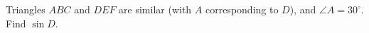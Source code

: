 Triangles $ABC$ and $DEF$ are similar (with $A$ corresponding to $D$), and $\angle A=30^\circ$. Find $\sin D$.
